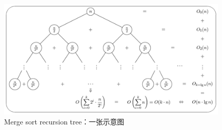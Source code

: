 \documentclass[UTF8,AutoFakeBold,AutoFakeSlant,zihao=-4]{ctexart}
\begin{document}
\begin{figure}[!ht]
  \centering
  \includegraphics[width=0.6\linewidth]{img/merge-sort-recursion-tree}
  \caption{Merge sort recursion tree：一张示意图}
  \label{fig:mergesort}
\end{figure}
\end{document}
